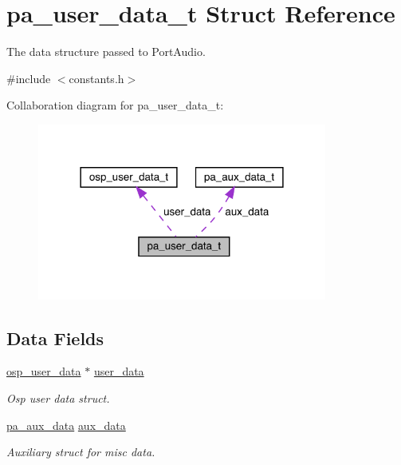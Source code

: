\hypertarget{structpa__user__data__t}{}\section{pa\+\_\+user\+\_\+data\+\_\+t Struct Reference}
\label{structpa__user__data__t}


The data structure passed to Port\+Audio.  




{\ttfamily \#include $<$constants.\+h$>$}



Collaboration diagram for pa\+\_\+user\+\_\+data\+\_\+t\+:\nopagebreak
\begin{figure}[H]
\begin{center}
\leavevmode
\includegraphics[width=270pt]{structpa__user__data__t__coll__graph}
\end{center}
\end{figure}
\subsection*{Data Fields}
\begin{DoxyCompactItemize}
\item 
\mbox{\hyperlink{constants_8h_a2d1d78531fe12807c3852488556d5a4b}{osp\+\_\+user\+\_\+data}} $\ast$ \mbox{\hyperlink{structpa__user__data__t_afcb50245302828da62e070d923d145c3}{user\+\_\+data}}
\begin{DoxyCompactList}\small\item\em Osp user data struct. \end{DoxyCompactList}\item 
\mbox{\hyperlink{constants_8h_add46628e302aedde68d37aea654eda24}{pa\+\_\+aux\+\_\+data}} \mbox{\hyperlink{structpa__user__data__t_a474dfc8856d57bc28146dbb593147c33}{aux\+\_\+data}}
\begin{DoxyCompactList}\small\item\em Auxiliary struct for misc data. \end{DoxyCompactList}\end{DoxyCompactItemize}


